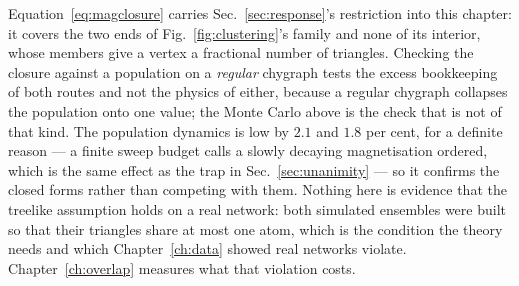 Equation~\eqref{eq:magclosure} carries Sec.~\ref{sec:response}'s restriction
into this chapter: it covers the two ends of Fig.~\ref{fig:clustering}'s family
and none of its interior, whose members give a vertex a fractional number of
triangles. Checking the closure against a population on a \emph{regular}
chygraph tests the excess bookkeeping of both routes and not the physics of
either, because a regular chygraph collapses the population onto one value; the
Monte Carlo above is the check that is not of that kind.
The population dynamics is low by $2.1$ and $1.8$ per cent, for a definite reason ---
a finite sweep budget calls a slowly decaying magnetisation ordered, which is
the same effect as the trap in Sec.~\ref{sec:unanimity} --- so it confirms the
closed forms rather than competing with them. Nothing here is evidence that the
treelike assumption holds on a real network: both simulated ensembles were built
so that their triangles share at most one atom, which is the condition the
theory needs and which Chapter~\ref{ch:data} showed real networks violate.
Chapter~\ref{ch:overlap} measures what that violation costs.
